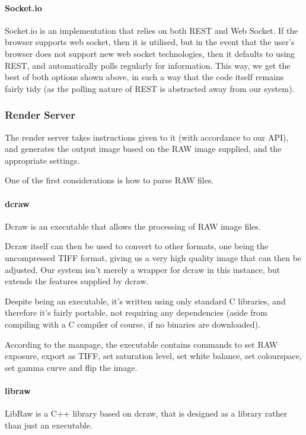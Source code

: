 \documentclass[12pt,a4paper]{article}
\begin{document}
\paragraph{Socket.io}
Socket.io is an implementation that relies on both REST and Web Socket.
If the browser supports web socket, then it is utilised, but in the event that the
user's browser does not support new web socket technologies, then it defaults to
using REST, and automatically polls regularly for information. This way, we get the
best of both options shown above, in such a way that the code itself remains fairly
tidy (as the polling nature of REST is abstracted away from our system).

\subsubsection{Render Server}
The render server takes instructions given to it (with accordance to our API), and
generates the output image based on the RAW image supplied, and the appropriate settings.

One of the first considerations is how to parse RAW files.

\paragraph{dcraw}
Dcraw is an executable that allows the processing of RAW image files.

Dcraw itself can then be used to convert to other formats, one being the uncompressed TIFF format,
giving us a very high quality image that can then be adjusted. Our system isn't merely a wrapper for
dcraw in this instance, but extends the features supplied by dcraw.

Despite being an executable, it's written using only standard C libraries, and therefore it's
fairly portable, not requiring any dependencies (aside from compiling with a C compiler of course, if
no binaries are downloaded). \cite{DcrawWebsite}

According to the manpage, the executable contains commands to set RAW exposure, export as TIFF,
set saturation level, set white balance, set colourspace, set gamma curve and flip the image. \cite{DcrawManpage}


\paragraph{libraw}
LibRaw is a C++ library based on dcraw, that is designed as a library rather than just
an executable.
\end{document}
